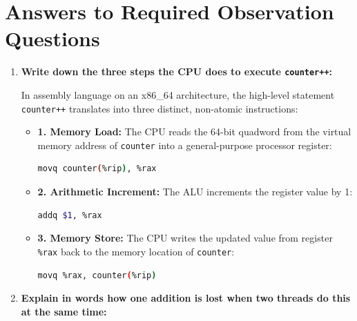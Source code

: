 \documentclass[12pt,a4paper]{report}
\numberwithin{equation}{chapter}
\numberwithin{figure}{chapter}
\numberwithin{table}{chapter}
\begin{document}
\section{Answers to Required Observation Questions}
\begin{enumerate}
    \item \textbf{Write down the three steps the CPU does to execute \texttt{counter++}:}
    
    In assembly language on an x86\_64 architecture, the high-level statement \texttt{counter++} translates into three distinct, non-atomic instructions:
    \begin{itemize}
        \item \textbf{1. Memory Load:} The CPU reads the 64-bit quadword from the virtual memory address of \texttt{counter} into a general-purpose processor register:
        \begin{lstlisting}[language=bash]
        movq counter(%rip), %rax
        \end{lstlisting}
        \item \textbf{2. Arithmetic Increment:} The ALU increments the register value by 1:
        \begin{lstlisting}[language=bash]
        addq $1, %rax
        \end{lstlisting}
        \item \textbf{3. Memory Store:} The CPU writes the updated value from register \texttt{\%rax} back to the memory location of \texttt{counter}:
        \begin{lstlisting}[language=bash]
        movq %rax, counter(%rip)
        \end{lstlisting}
    \end{itemize}

    \item \textbf{Explain in words how one addition is lost when two threads do this at the same time:}
    

\end{enumerate}
\end{document}
